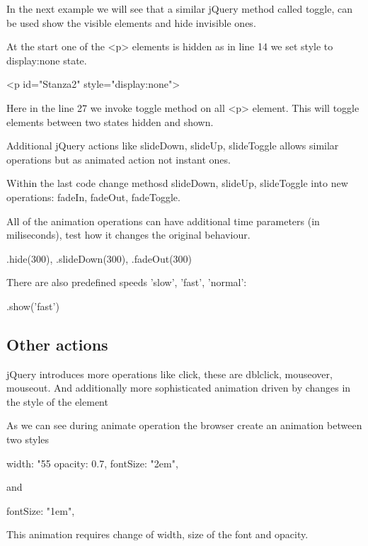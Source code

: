 In the next example we will see that a similar jQuery method called toggle, can be used show the visible elements and hide invisible ones.


\begin{explain}
At the start one of the <p> elements is hidden as in line 14  we set style to display:none state.
\begin{html}
<p id="Stanza2" style="display:none">
\end{html}
Here in the line 27 we invoke toggle method on all <p> element. This will toggle elements between two states hidden and shown.
\end{explain}

Additional jQuery actions like slideDown, slideUp, slideToggle allows similar operations but as animated action not instant ones.


\begin{extercises}
Within the last code change methosd slideDown, slideUp, slideToggle into new operations: fadeIn, fadeOut, fadeToggle.
\end{extercises}

\begin{extercises}
All of the animation operations can have additional time parameters (in miliseconds), test how it changes the original behaviour.
\begin{js}
.hide(300),
.slideDown(300),
.fadeOut(300)
\end{js}


There are also predefined speeds 'slow', 'fast', 'normal':
\begin{js}
.show('fast')
\end{js}
\end{extercises}

\subsection{Other actions}
jQuery introduces more operations like click, these are dblclick, mouseover, mouseout. And additionally more sophisticated animation driven by changes in the style of the element


\begin{explain}
  As we can see during animate operation the browser create an animation between two styles
  \begin{js}
    width: "55%
    opacity: 0.7,
    fontSize: "2em",
  \end{js}
   and
  \begin{js}
    fontSize: "1em",
  \end{js}

This animation requires change of width, size of the font and opacity.
\end{explain} 